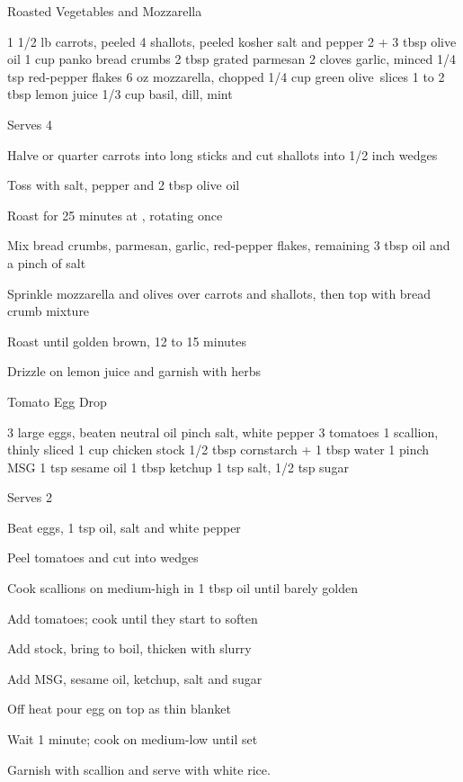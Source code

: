 \begin{denserecipe}{Roasted Vegetables and Mozzarella}{}
\begin{ingredients}
1 1/2 lb carrots, peeled
4 shallots, peeled
kosher salt and pepper
2 + 3 tbsp olive oil
1 cup panko bread crumbs
2 tbsp grated parmesan
2 cloves garlic, minced
1/4 tsp red-pepper flakes
6 oz mozzarella, chopped
1/4 cup green \mbox{olive slices}
1 to 2 tbsp lemon juice
1/3 cup basil, dill, mint
\end{ingredients}
\nextcolumn
Serves 4
\begin{steps}
\item Halve or quarter carrots into long sticks and cut shallots into 1/2 inch wedges
\item Toss with salt, pepper and 2 tbsp olive oil
\item Roast for 25 minutes at , rotating once
\item Mix bread crumbs, parmesan, garlic, red-pepper flakes, remaining 3 tbsp oil and a pinch of salt
\item Sprinkle mozzarella and olives over carrots and shallots, then top with bread crumb mixture
\item Roast until golden brown, 12 to 15 minutes
\item Drizzle on lemon juice and garnish with herbs
\end{steps}
\end{denserecipe}

\begin{denserecipe}{Tomato Egg Drop}{}
\begin{ingredients}
3 large eggs, beaten
neutral oil
pinch salt, white pepper
3 tomatoes
1 scallion, thinly sliced
1 cup chicken stock
1/2 tbsp cornstarch + 1 tbsp water
1 pinch MSG
1 tsp sesame oil
1 tbsp ketchup
1 tsp salt, 1/2 tsp sugar
\end{ingredients}
\nextcolumn
Serves 2
\begin{steps}
    \item Beat eggs, 1 tsp oil, salt and white pepper
    \item Peel tomatoes and cut into wedges
    \item Cook scallions on medium-high in 1 tbsp oil until barely golden
    \item Add tomatoes; cook until they start to soften
    \item Add stock, bring to boil, thicken with slurry
    \item Add MSG, sesame oil, ketchup, salt and sugar
    \item Off heat pour egg on top as thin blanket
    \item Wait 1 minute; cook on medium-low until set
\end{steps}
Garnish with scallion and serve with white rice.
\end{denserecipe}

